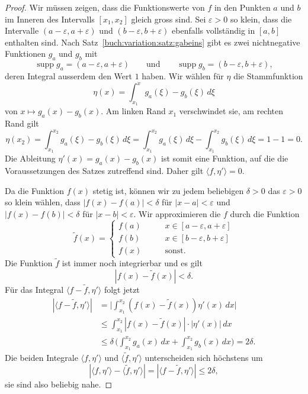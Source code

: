 

\begin{proof}
Wir müssen zeigen, dass die Funktionswerte von $f$ in den Punkten $a$ und $b$
im Inneren des Intervalls $[x_1,x_2]$ gleich gross sind.
Sei $\varepsilon>0$ so klein, dass die Intervalle
$(a-\varepsilon,a+\varepsilon)$ und $(b-\varepsilon,b+\varepsilon)$ ebenfalls
vollständig in $[a,b]$ enthalten sind.
Nach Satz~\ref{buch:variation:satz:gabeins} gibt es zwei nichtnegative
Funktionen $g_a$ und $g_b$ mit
\[
\operatorname{supp} g_a = (a-\varepsilon,a+\varepsilon)
\qquad\text{und}\qquad
\operatorname{supp} g_b = (b-\varepsilon,b+\varepsilon),
\]
deren Integral ausserdem den Wert $1$ haben.
Wir wählen für $\eta$ die Stammfunktion
\[
\eta(x)
=
\int_{x_1}^x g_a(\xi)-g_b(\xi)\,d\xi
\]
von $x\mapsto g_a(x) -g_b(x)$.
Am linken Rand $x_1$ verschwindet sie, am rechten Rand gilt
\[
\eta(x_2)
=
\int_{x_1}^{x_2}
g_a(\xi)-g_b(\xi)
\,d\xi
=
\int_{x_1}^{x_2}
g_a(\xi)
\,d\xi
-
\int_{x_1}^{x_2}
g_b(\xi)
\,d\xi
=
1-1
=
0.
\]
Die Ableitung $\eta'(x)=g_a(x)-g_b(x)$ ist somit eine Funktion,
auf die die Voraussetzungen des Satzes zutreffend sind.
Daher gilt $\langle f,\eta'\rangle=0$.

Da die Funktion $f(x)$ stetig ist, können wir zu jedem beliebigen 
$\delta>0$ das $\varepsilon>0$ so klein wählen, dass 
$|f(x)-f(a)|<\delta$ für $|x-a|<\varepsilon$ und
$|f(x)-f(b)|<\delta$ für $|x-b|<\varepsilon$.
Wir approximieren die $f$ durch die Funktion
\[
\tilde{f}(x)
=
\begin{cases}
f(a)&\qquad x\in[a-\varepsilon,a+\varepsilon]\\
f(b)&\qquad x\in[b-\varepsilon,b+\varepsilon]\\
f(x)&\qquad\text{sonst}.
\end{cases}
\]
Die Funktion $\tilde{f}$ ist immer noch integrierbar und es gilt
\[
|f(x)-\tilde{f}(x)| < \delta.
\]
Für das Integral $\langle f-\tilde{f}, \eta'\rangle$ folgt jetzt
\begin{align*}
|\langle f-\tilde{f},\eta'\rangle|
&=
\biggl|
\int_{x_1}^{x_2}
(f(x)-\tilde{f}(x))\eta'(x)
\,dx
\biggr|
\\
&\le
\int_{x_1}^{x_2}
|f(x)-\tilde{f}(x)| \cdot |\eta'(x)|
\,dx
\\
&\le 
\delta
\,
\biggl(
\int_{x_1}^{x_2} g_a(x)\,dx
+
\int_{x_1}^{x_2} g_b(x)\,dx
\biggr)
=
2\delta.
\end{align*}
Die beiden Integrale $\langle f,\eta'\rangle$ und 
$\langle \tilde{f},\eta'\rangle$ unterscheiden sich höchstens um
\begin{equation}
|\langle f,\eta'\rangle - \langle \tilde{f},\eta'\rangle|
=
|\langle f-\tilde{f},\eta' \rangle|
\le
2\delta,
\label{buch:nichtdiff:duboisreymond:eqn:ftildef}
\end{equation}
sie sind also beliebig nahe.


\end{proof}
